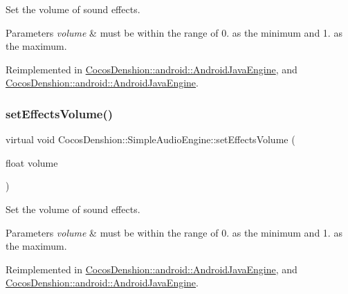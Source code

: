 Set the volume of sound effects.


\begin{DoxyParams}{Parameters}
{\em volume} & must be within the range of 0. as the minimum and 1. as the maximum. \\
\hline
\end{DoxyParams}


Reimplemented in \hyperlink{classCocosDenshion_1_1android_1_1AndroidJavaEngine_a45995fa6c9d77a9da8c2b389a9d938bd}{Cocos\+Denshion\+::android\+::\+Android\+Java\+Engine}, and \hyperlink{classCocosDenshion_1_1android_1_1AndroidJavaEngine_a409927c7297304f191bf3b96c289fb7a}{Cocos\+Denshion\+::android\+::\+Android\+Java\+Engine}.

\mbox{\label{classCocosDenshion_1_1SimpleAudioEngine_ac7df34b62f2e2c822d4eb480669feea5}} 
\subsubsection{\texorpdfstring{set\+Effects\+Volume()}{setEffectsVolume()}\hspace{0.1cm}{\footnotesize\ttfamily [2/2]}}
{\footnotesize\ttfamily virtual void Cocos\+Denshion\+::\+Simple\+Audio\+Engine\+::set\+Effects\+Volume (\begin{DoxyParamCaption}\item[{float}]{volume }\end{DoxyParamCaption})\hspace{0.3cm}{\ttfamily [virtual]}}

Set the volume of sound effects.


\begin{DoxyParams}{Parameters}
{\em volume} & must be within the range of 0. as the minimum and 1. as the maximum. \\
\hline
\end{DoxyParams}


Reimplemented in \hyperlink{classCocosDenshion_1_1android_1_1AndroidJavaEngine_a45995fa6c9d77a9da8c2b389a9d938bd}{Cocos\+Denshion\+::android\+::\+Android\+Java\+Engine}, and \hyperlink{classCocosDenshion_1_1android_1_1AndroidJavaEngine_a409927c7297304f191bf3b96c289fb7a}{Cocos\+Denshion\+::android\+::\+Android\+Java\+Engine}.

